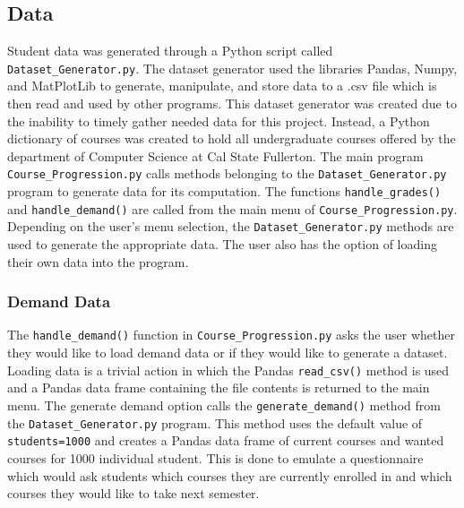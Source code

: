 \documentclass[12pt]{article}
\begin{document}
\subsection*{Data}
Student data was generated through a Python script called \texttt{Dataset\_Generator.py}. The dataset 
generator used the libraries Pandas, Numpy, and MatPlotLib to generate, manipulate, and store data to a .csv file
which is then read and used by other programs. This dataset generator was created due to the inability to timely 
gather needed data for this project. Instead, a Python dictionary of courses was created to hold all 
undergraduate courses offered by the department of Computer Science at Cal State Fullerton. The main 
program \texttt{Course\_Progression.py} calls methods belonging to the \texttt{Dataset\_Generator.py} 
program to generate data for its computation. The functions \texttt{handle\_grades()} and \texttt{handle\_demand()} 
are called from the main menu of \texttt{Course\_Progression.py}. Depending on the user's menu selection,
the \texttt{Dataset\_Generator.py} methods are used to generate the appropriate data. The user also has the
option of loading their own data into the program.

\subsubsection*{Demand Data}
The \texttt{handle\_demand()} function in \texttt{Course\_Progression.py} asks the user whether they would like
to load demand data or if they would like to generate a dataset. Loading data is a trivial action in which the 
Pandas \texttt{read\_csv()} method is used and a Pandas data frame containing the file contents is returned to 
the main menu. The generate demand option calls the \texttt{generate\_demand()} method from the
\texttt{Dataset\_Generator.py} program. This method uses the default value of \texttt{students=1000} and 
creates a Pandas data frame of current courses and wanted courses for 1000 individual student. This is done 
to emulate a questionnaire which would ask students which courses they are currently enrolled in and which 
courses they would like to take next semester. 
\end{document}
